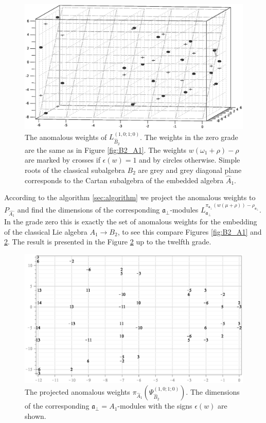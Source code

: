 \documentclass[12pt]{iopart}
\theoremstyle{definition}
\newcommand{\afb}{\mathfrak{a}_{\bot}}
\begin{document}
\begin{figure}[h!tb]
  \includegraphics[width=140mm]{figure11.eps}
  \caption{The anomalous weights of $L^{(1,0;1;0)}_{\hat B_2 }$.
  The weights in the zero grade are the same as in Figure \ref{fig:B2_A1}.
  The weights $w (\omega_1+\rho)-\rho$ are marked by crosses if $\epsilon(w)=1$ and by circles otherwise.
Simple roots of the classical subalgebra $B_2$ are grey and grey diagonal plane corresponds to the Cartan subalgebra
of the embedded algebra $\hat{A}_1$.}
  \label{fig:affine_B2_anom_point}
\end{figure}

According to the algorithm \ref{sec:algorithm} we project the anomalous weights to
$P_{\hat{A_1}}$ and find the dimensions of the corresponding
$\afb$-modules $L^{\pi_{\afb}(w(\mu+\rho))-\rho_{\afb}}_{\afb}$.
In the grade zero this is exactly the set of anomalous weights for the embedding of
the classical Lie algebra $A_1\rightarrow B_2$, to see this compare Figures \ref{fig:B2_A1}
and \ref{fig:AffineB2_A1_anom_proj}.
The result is presented in the Figure
\ref{fig:AffineB2_A1_anom_proj} up to the twelfth grade.
\begin{figure}[h!tb]
  \centering
  \includegraphics[width=120mm]{figure12.eps}
  \caption{The projected anomalous weights $\pi_{\hat A_1}\left(\Psi^{(1,0;1;0)}_{\hat B_2}\right)$. The dimensions of the corresponding $\afb=A_1$-modules with the signs $\epsilon(w)$ are shown.}
  \label{fig:AffineB2_A1_anom_proj}
\end{figure}
\end{document}
